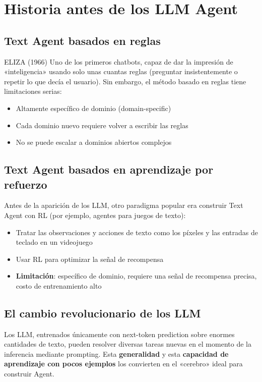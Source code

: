 \section{Historia antes de los LLM Agent}

\subsection{Text Agent basados en reglas}

\begin{knowledgebox}{ELIZA (1966)}
Uno de los primeros chatbots, capaz de dar la impresión de «inteligencia» usando solo unas cuantas reglas (preguntar insistentemente o repetir lo que decía el usuario). Sin embargo, el método basado en reglas tiene limitaciones serias:
\begin{itemize}
    \item Altamente específico de dominio (domain-specific)
    \item Cada dominio nuevo requiere volver a escribir las reglas
    \item No se puede escalar a dominios abiertos complejos
\end{itemize}
\end{knowledgebox}

\subsection{Text Agent basados en aprendizaje por refuerzo}

Antes de la aparición de los LLM, otro paradigma popular era construir Text Agent con RL (por ejemplo, agentes para juegos de texto):

\begin{itemize}
    \item Tratar las observaciones y acciones de texto como los píxeles y las entradas de teclado en un videojuego
    \item Usar RL para optimizar la señal de recompensa
    \item \textbf{Limitación}: específico de dominio, requiere una señal de recompensa precisa, costo de entrenamiento alto
\end{itemize}

\subsection{El cambio revolucionario de los LLM}

Los LLM, entrenados únicamente con next-token prediction sobre enormes cantidades de texto, pueden resolver diversas tareas nuevas en el momento de la inferencia mediante prompting. Esta \textbf{generalidad} y esta \textbf{capacidad de aprendizaje con pocos ejemplos} los convierten en el «cerebro» ideal para construir Agent.

